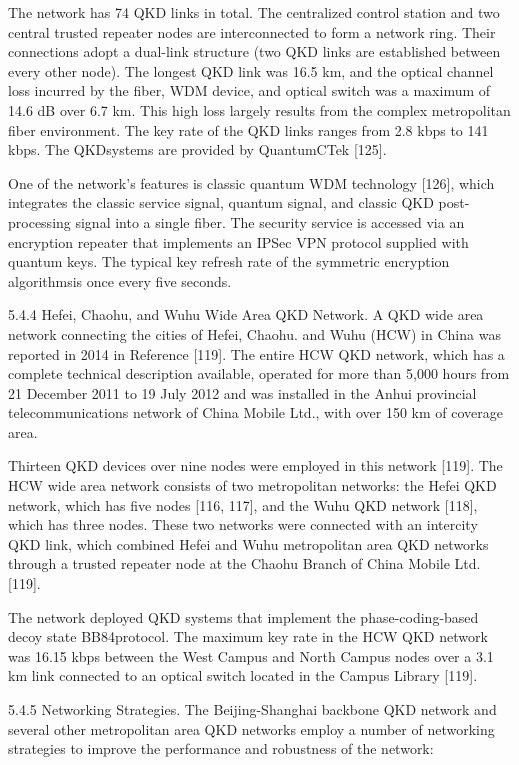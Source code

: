 The network has 74 QKD links in total. The centralized control station and two central trusted repeater nodes are interconnected to form a network ring. Their connections adopt a dual-link structure (two QKD links are established between every other node). The longest QKD link was 16.5 km, and the optical channel loss incurred by the fiber, WDM device, and optical switch was a maximum of 14.6 dB over 6.7 km. This high loss largely results from the complex metropolitan fiber environment. The key rate of the QKD links ranges from 2.8 kbps to 141 kbps. The QKDsystems are provided by QuantumCTek [125].

One of the network’s features is classic quantum WDM technology [126], which integrates the classic service signal, quantum signal, and classic QKD post-processing signal into a single fiber. The security service is accessed via an encryption repeater that implements an IPSec VPN protocol supplied with quantum keys. The typical key refresh rate of the symmetric encryption algorithmsis once every five seconds.

5.4.4 Hefei, Chaohu, and Wuhu Wide Area QKD Network. A QKD wide area network connecting the cities of Hefei, Chaohu. and Wuhu (HCW) in China was reported in 2014 in Reference [119].
The entire HCW QKD network, which has a complete technical description available, operated for more than 5,000 hours from 21 December 2011 to 19 July 2012 and was installed in the Anhui provincial telecommunications network of China Mobile Ltd., with over 150 km of coverage area.

Thirteen QKD devices over nine nodes were employed in this network [119]. The HCW wide area network consists of two metropolitan networks: the Hefei QKD network, which has five nodes [116, 117], and the Wuhu QKD network [118], which has three nodes. These two networks were connected with an intercity QKD link, which combined Hefei and Wuhu metropolitan area QKD networks through a trusted repeater node at the Chaohu Branch of China Mobile Ltd. [119].

The network deployed QKD systems that implement the phase-coding-based decoy state BB84protocol. The maximum key rate in the HCW QKD network was 16.15 kbps between the West Campus and North Campus nodes over a 3.1 km link connected to an optical switch located in the Campus Library [119].

5.4.5 Networking Strategies. The Beijing-Shanghai backbone QKD network and several other metropolitan area QKD networks employ a number of networking strategies to improve the performance and robustness of the network:

